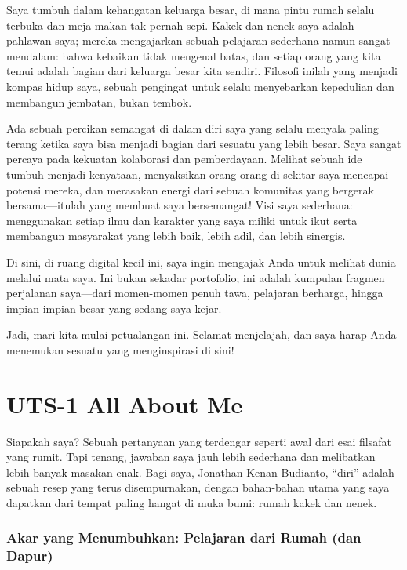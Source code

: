 \documentclass[
  letterpaper,
  DIV=11,
  numbers=noendperiod]{scrreprt}
\begin{document}
Saya tumbuh dalam kehangatan keluarga besar, di mana pintu rumah selalu
terbuka dan meja makan tak pernah sepi. Kakek dan nenek saya adalah
pahlawan saya; mereka mengajarkan sebuah pelajaran sederhana namun
sangat mendalam: bahwa kebaikan tidak mengenal batas, dan setiap orang
yang kita temui adalah bagian dari keluarga besar kita sendiri. Filosofi
inilah yang menjadi kompas hidup saya, sebuah pengingat untuk selalu
menyebarkan kepedulian dan membangun jembatan, bukan tembok.

Ada sebuah percikan semangat di dalam diri saya yang selalu menyala
paling terang ketika saya bisa menjadi bagian dari sesuatu yang lebih
besar. Saya sangat percaya pada kekuatan kolaborasi dan pemberdayaan.
Melihat sebuah ide tumbuh menjadi kenyataan, menyaksikan orang-orang di
sekitar saya mencapai potensi mereka, dan merasakan energi dari sebuah
komunitas yang bergerak bersama---itulah yang membuat saya bersemangat!
Visi saya sederhana: menggunakan setiap ilmu dan karakter yang saya
miliki untuk ikut serta membangun masyarakat yang lebih baik, lebih
adil, dan lebih sinergis.

Di sini, di ruang digital kecil ini, saya ingin mengajak Anda untuk
melihat dunia melalui mata saya. Ini bukan sekadar portofolio; ini
adalah kumpulan fragmen perjalanan saya---dari momen-momen penuh tawa,
pelajaran berharga, hingga impian-impian besar yang sedang saya kejar.

Jadi, mari kita mulai petualangan ini. Selamat menjelajah, dan saya
harap Anda menemukan sesuatu yang menginspirasi di sini!


\chapter{UTS-1 All About Me}\label{uts-1-all-about-me}

Siapakah saya? Sebuah pertanyaan yang terdengar seperti awal dari esai
filsafat yang rumit. Tapi tenang, jawaban saya jauh lebih sederhana dan
melibatkan lebih banyak masakan enak. Bagi saya, Jonathan Kenan
Budianto, ``diri'' adalah sebuah resep yang terus disempurnakan, dengan
bahan-bahan utama yang saya dapatkan dari tempat paling hangat di muka
bumi: rumah kakek dan nenek.

\subsection{Akar yang Menumbuhkan: Pelajaran dari Rumah (dan
Dapur)}\label{akar-yang-menumbuhkan-pelajaran-dari-rumah-dan-dapur}
\end{document}
